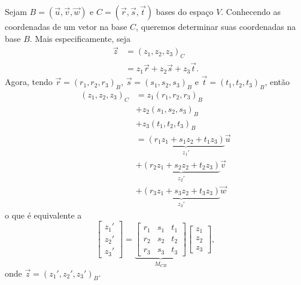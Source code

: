 Sejam $B = (\vec{u}, \vec{v}, \vec{w})$ e $C = (\vec{r}, \vec{s}, \vec{t})$ bases do espaço $V$. Conhecendo as coordenadas de um vetor na base $C$, queremos determinar suas coordenadas na base $B$. Mais especificamente, seja
\begin{align}
  \vec{z} &= (z_1, z_2, z_3)_C\\
  &= z_1\vec{r} + z_2\vec{s} + z_3\vec{t}.
\end{align}
Agora, tendo $\vec{r} = (r_1, r_2, r_3)_B$, $\vec{s} = (s_1, s_2, s_3)_B$ e $\vec{t} = (t_1, t_2, t_3)_B$, então
\begin{align}
  (z_1, z_2, z_3)_C &= z_1(r_1, r_2, r_3)_B \\
                    &+ z_2(s_1, s_2, s_3)_B \\
                    &+ z_3(t_1, t_2, t_3)_B\\
                    &= \underbrace{(r_1z_1+s_1z_2+t_1z_3)}_{z_1'}\vec{u}\\
                    &+ \underbrace{(r_2z_1+s_2z_2+t_2z_3)}_{z_2'}\vec{v}\\
                    &+ \underbrace{(r_3z_1+s_3z_2+t_3z_3)}_{z_3'}\vec{w}
\end{align}
o que é equivalente a
\begin{equation}\label{eq:cbsmb_mcb}
  \begin{bmatrix}
    z_1'\\
    z_2'\\
    z_3'
  \end{bmatrix} =
  \underbrace{\begin{bmatrix}
    r_1 & s_1 & t_1\\
    r_2 & s_2 & t_2\\
    r_3 & s_3 & t_3
  \end{bmatrix}}_{M_{CB}}
  \begin{bmatrix}
    z_1\\
    z_2\\
    z_3
  \end{bmatrix},
\end{equation}
onde $\vec{z} = (z_1', z_2', z_3')_B$.

